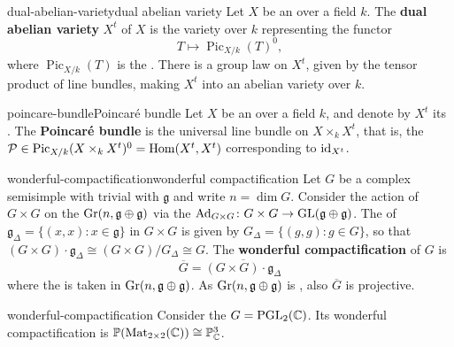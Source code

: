 \begin{topic}{dual-abelian-variety}{dual abelian variety}
    Let $X$ be an  over a field $k$. The \textbf{dual abelian variety} $X^t$ of $X$ is the variety over $k$ representing the functor
    \[ T \mapsto \operatorname{Pic}_{X/k}(T)^0 , \]
    where $\operatorname{Pic}_{X/k}(T)$ is the . There is a group law on $X^t$, given by the tensor product of line bundles, making $X^t$ into an abelian variety over $k$.
\end{topic}

\begin{topic}{poincare-bundle}{Poincaré bundle}
    Let $X$ be an  over a field $k$, and denote by $X^t$ its . The \textbf{Poincaré bundle} is the universal line bundle on $X \times_k X^t$, that is, the  $\mathcal{P} \in \operatorname{Pic}_{X/k}(X \times_k X^t)^0 = \operatorname{Hom}(X^t, X^t)$ corresponding to $\textup{id}_{X^t}$.
\end{topic}

\begin{topic}{wonderful-compactification}{wonderful compactification}
    Let $G$ be a complex  semisimple  with trivial  with  $\mathfrak{g}$ and write $n = \dim G$. Consider the action of $G \times G$ on the  $\textup{Gr}(n, \mathfrak{g} \oplus \mathfrak{g})$ via the  $\textup{Ad}_{G \times G} \colon G \times G \to \textup{GL}(\mathfrak{g} \oplus \mathfrak{g})$. The  of $\mathfrak{g}_\Delta = \{ (x, x) : x \in \mathfrak{g} \}$ in $G \times G$ is given by $G_\Delta = \{ (g, g) : g \in G \}$, so that $(G \times G) \cdot \mathfrak{g}_\Delta \cong (G \times G) / G_\Delta \cong G$.
    The \textbf{wonderful compactification} of $G$ is
    \[ \overline{G} = \overline{(G \times G) \cdot \mathfrak{g}_\Delta} \]
    where the  is taken in $\textup{Gr}(n, \mathfrak{g} \oplus \mathfrak{g})$. As $\textup{Gr}(n, \mathfrak{g} \oplus \mathfrak{g})$ is , also $\overline{G}$ is projective.
\end{topic}

\begin{example}{wonderful-compactification}
    Consider the  $G = \textup{PGL}_2(\mathbb{C})$. Its wonderful compactification is $\mathbb{P}(\textup{Mat}_{2 \times 2}(\mathbb{C})) \cong \mathbb{P}^3_{\mathbb{C}}$.
\end{example}

